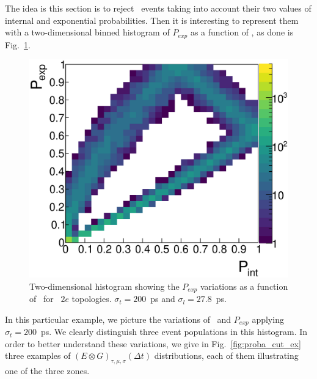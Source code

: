 The idea is this section is to reject \Tl\ events taking into account their two values of internal and exponential probabilities.
Then it is interesting to represent them with a two-dimensional binned histogram of $P_{exp}$ as a function of \Pint, as done is Fig.~\ref{fig:biplot_Pexp_Pint}.
\begin{figure}[!h]
  \centering
  \includegraphics[width=15cm]{timedifference/fig_timediff/PintVSPexp_208Tl_200.eps}
  \caption{Two-dimensional histogram showing the $P_{exp}$ variations as a function of \Pint\ for \Tl\ $2e$ topologies.
    $\sigma_{t}=200$~ps and $\sigma_{l}=27.8$~ps.
    \label{fig:biplot_Pexp_Pint}}
\end{figure}
In this particular example, we picture the variations of \Pint\ and $P_{exp}$ applying ${\sigma_{t}=200}$~ps.
We clearly distinguish three event populations in this histogram.
In order to better understand these variations, we give in Fig.~\ref{fig:proba_cut_ex} three examples of ${(E \otimes G)_{\tau,\mu,\sigma}(\Delta t)}$ distributions, each of them illustrating one of the three zones.

